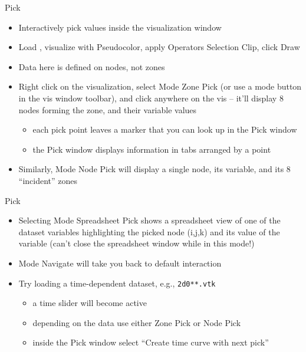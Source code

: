 \begin{frame}{Pick}
  \begin{itemize}\setlength{\itemsep}{3mm}
  \item Interactively pick values inside the visualization window
  \item Load , visualize  with Pseudocolor, apply Operators \ra Selection \ra Clip,
    click Draw
  \item{\color{red} Data here is defined on nodes, not zones}
    \pause
  \item Right click on the visualization, select Mode \ra Zone Pick (or use a mode button in the vis
        window
    toolbar), and click anywhere on the vis -- it'll display 8 nodes forming the zone, and their variable
    values
    \begin{itemize}\setlength{\itemsep}{0mm}
    \item each pick point leaves a marker that you can look up in the Pick window
    \item the Pick window displays information in tabs arranged by a point
    \end{itemize}
    \pause
  \item Similarly, Mode \ra Node Pick will display a single node, its variable, and its 8 ``incident''
    zones
  \end{itemize}
\end{frame}

\begin{frame}{Pick}
  \begin{itemize}\setlength{\itemsep}{3mm}
  \item Selecting Mode \ra Spreadsheet Pick shows a spreadsheet view of one of the dataset variables
    highlighting the picked node (i,j,k) and its value of the variable (can't close the spreadsheet
    window while in this mode!)
    \pause
  \item Mode \ra Navigate will take you back to default interaction
    \pause
  \item Try loading a time-dependent dataset, e.g., \texttt{2d0**.vtk}
    \begin{itemize}\setlength{\itemsep}{0mm}
    \item a time slider will become active
    \item depending on the data use either Zone Pick or Node Pick
    \item inside the Pick window select ``Create time curve with next pick''
    \end{itemize}
  \end{itemize}
\end{frame}

